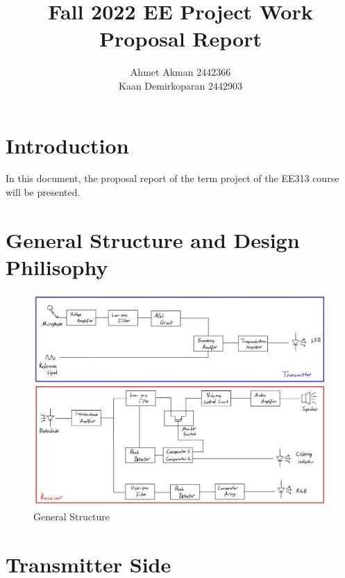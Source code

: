 \documentclass[a4paper,10pt]{IEEEtran}
\begin{document}
\thispagestyle{empty}
\vspace{-2cm}

\title{  Fall 2022 EE Project Work  \protect\\ Proposal Report}
\author{ Ahmet Akman 2442366 \protect\\ Kaan Demirkoparan 2442903}
\date{}
\maketitle
\vspace{-5cm}

\section{Introduction}
In this document, the proposal report of the term project of the EE313 course will be presented. 
\vspace{-0.4cm}
\section{General Structure and Design Philisophy}
\begin{figure}[htbp!]
    \centering
    \includegraphics[width = 1\linewidth]{general_structure.jpeg}
    \caption{General Structure}
\end{figure} 
\vspace{-0.8cm}
\section{Transmitter Side}
\vspace{-0.1cm}
\end{document}
